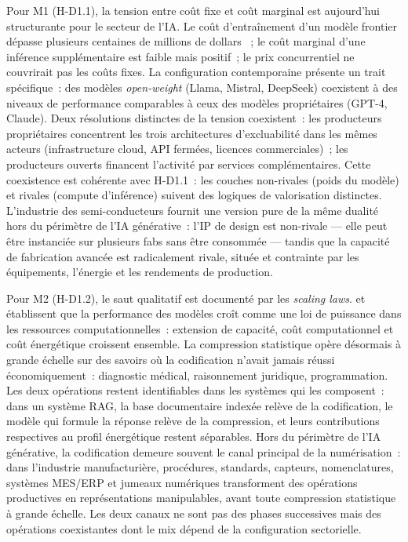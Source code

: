 Pour M1 (H-D1.1), la tension entre coût fixe et coût marginal est aujourd'hui structurante pour le secteur de l'IA. Le coût d'entraînement d'un modèle frontier dépasse plusieurs centaines de millions de dollars \parencite{cottier_rapid_2025}~; le coût marginal d'une inférence supplémentaire est faible mais positif~; le prix concurrentiel ne couvrirait pas les coûts fixes. La configuration contemporaine présente un trait spécifique~: des modèles \emph{open-weight} (Llama, Mistral, DeepSeek) coexistent à des niveaux de performance comparables à ceux des modèles propriétaires (GPT-4, Claude). Deux résolutions distinctes de la tension coexistent~: les producteurs propriétaires concentrent les trois architectures d'excluabilité dans les mêmes acteurs (infrastructure cloud, API fermées, licences commerciales)~; les producteurs ouverts financent l'activité par services complémentaires. Cette coexistence est cohérente avec H-D1.1~: les couches non-rivales (poids du modèle) et rivales (compute d'inférence) suivent des logiques de valorisation distinctes. L'industrie des semi-conducteurs fournit une version pure de la même dualité hors du périmètre de l'IA générative~: l'IP de design est non-rivale --- elle peut être instanciée sur plusieurs fabs sans être consommée --- tandis que la capacité de fabrication avancée est radicalement rivale, située et contrainte par les équipements, l'énergie et les rendements de production.

Pour M2 (H-D1.2), le saut qualitatif est documenté par les \emph{scaling laws}. \textcite{kaplan_scaling_2020} et \textcite{hoffmann_training_2022} établissent que la performance des modèles croît comme une loi de puissance dans les ressources computationnelles~: extension de capacité, coût computationnel et coût énergétique croissent ensemble. La compression statistique opère désormais à grande échelle sur des savoirs où la codification n'avait jamais réussi économiquement~: diagnostic médical, raisonnement juridique, programmation. Les deux opérations restent identifiables dans les systèmes qui les composent~: dans un système RAG, la base documentaire indexée relève de la codification, le modèle qui formule la réponse relève de la compression, et leurs contributions respectives au profil énergétique restent séparables. Hors du périmètre de l'IA générative, la codification demeure souvent le canal principal de la numérisation~: dans l'industrie manufacturière, procédures, standards, capteurs, nomenclatures, systèmes MES/ERP et jumeaux numériques transforment des opérations productives en représentations manipulables, avant toute compression statistique à grande échelle. Les deux canaux ne sont pas des phases successives mais des opérations coexistantes dont le mix dépend de la configuration sectorielle.

